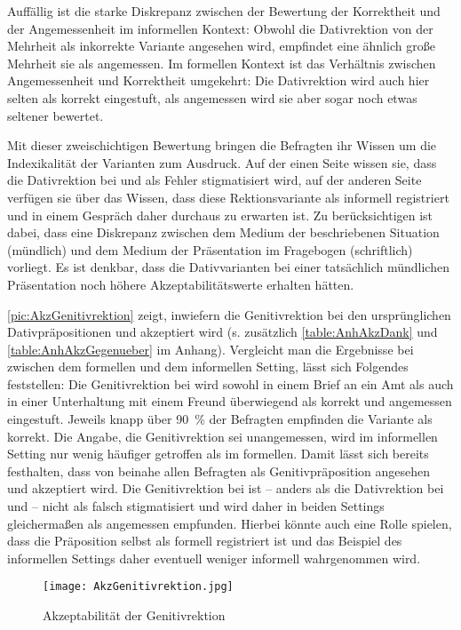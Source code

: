 Auffällig ist die starke Diskrepanz zwischen der Bewertung der Korrektheit und der Angemessenheit im informellen Kontext:
Obwohl die Dativrektion von der Mehrheit als inkorrekte Variante angesehen wird, empfindet eine ähnlich große Mehrheit sie als angemessen. 
Im formellen Kontext ist das Verhältnis zwischen Angemessenheit und Korrektheit umgekehrt: Die Dativrektion wird auch hier selten als korrekt eingestuft, als angemessen wird sie aber sogar noch etwas seltener bewertet. 

Mit dieser zweischichtigen Bewertung bringen die Befragten ihr Wissen um die Indexikalität der Varianten zum Ausdruck. 
Auf der einen Seite wissen sie, dass die Dativrektion bei \wegen{} und \waehrend{} als Fehler stigmatisiert wird, auf der anderen Seite verfügen sie über das Wissen, dass diese Rektionsvariante als informell registriert und in einem Gespräch daher durchaus zu erwarten ist. %
Zu berücksichtigen ist dabei, dass eine Diskrepanz zwischen dem Medium der beschriebenen Situation (mündlich) und dem Medium der Präsentation im Fragebogen (schriftlich) vorliegt. 
Es ist denkbar, dass die Dativvarianten bei einer tatsächlich mündlichen Präsentation noch höhere Akzeptabilitätswerte erhalten hätten. %

\autoref{pic:AkzGenitivrektion} zeigt, inwiefern die Genitivrektion bei den ursprünglichen Dativpräpositionen \dank{} und \gegenueber{} akzeptiert wird (s. zusätzlich \autoref{table:AnhAkzDank} und \autoref{table:AnhAkzGegenueber} im Anhang). 
Vergleicht man die Ergebnisse bei \dank{} zwischen dem formellen und dem informellen Setting, lässt sich Folgendes feststellen: 
Die Genitivrektion bei \dank{} wird sowohl in einem Brief an ein Amt als auch in einer Unterhaltung mit einem Freund überwiegend als korrekt und angemessen eingestuft. 
Jeweils knapp über 90~\% der Befragten empfinden die Variante als korrekt. 
Die Angabe, die Genitivrektion sei unangemessen, wird im informellen Setting nur wenig häufiger getroffen als im formellen.
Damit lässt sich bereits festhalten, dass \dank{} von beinahe allen Befragten als Genitivpräposition angesehen und akzeptiert wird. 
Die Genitivrektion bei \dank{} ist -- anders als die Dativrektion bei \wegen{} und \waehrend{} -- nicht als falsch stigmatisiert und wird daher in beiden Settings gleichermaßen als angemessen empfunden. %
Hierbei könnte auch eine Rolle spielen, dass die Präposition \dank{} selbst als formell registriert ist und das Beispiel des informellen Settings daher eventuell weniger informell wahrgenommen wird.%
\begin{figure}
\centering
\texttt{[image: AkzGenitivrektion.jpg]}
\caption{Akzeptabilität der Genitivrektion}
\label{pic:AkzGenitivrektion}
\end{figure}

